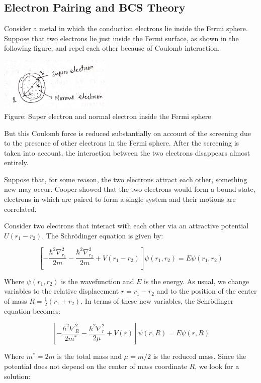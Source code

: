 \documentclass{article}
\begin{document}
\subsection{Electron Pairing and BCS Theory}

Consider a metal in which the conduction electrons lie inside the Fermi sphere. Suppose that two electrons lie just inside the Fermi surface, as shown in the following figure, and repel each other because of Coulomb interaction.

\begin{center}
    \includegraphics[width=0.4\textwidth]{figures/fermi_sphere.png} \\
    Figure: Super electron and normal electron inside the Fermi sphere
\end{center}

But this Coulomb force is reduced substantially on account of the screening due to the presence of other electrons in the Fermi sphere. After the screening is taken into account, the interaction between the two electrons disappears almost entirely.

Suppose that, for some reason, the two electrons attract each other, something new may occur. Cooper showed that the two electrons would form a bound state, electrons in which are paired to form a single system and their motions are correlated.

Consider two electrons that interact with each other via an attractive potential $U(r_1 - r_2)$. The Schrödinger equation is given by:

\[
\left[ -\frac{\hbar^2 \nabla_{r_1}^2}{2m} - \frac{\hbar^2 \nabla_{r_2}^2}{2m} + V(r_1 - r_2) \right] \psi(r_1, r_2) = E \psi(r_1, r_2) \tag{1}
\]

Where $\psi(r_1, r_2)$ is the wavefunction and $E$ is the energy. As usual, we change variables to the relative displacement $r = r_1 - r_2$ and to the position of the center of mass $R = \frac{1}{2}(r_1 + r_2)$. In terms of these new variables, the Schrödinger equation becomes:

\[
\left[ -\frac{\hbar^2 \nabla_{R}^2}{2m^*} - \frac{\hbar^2 \nabla_{r}^2}{2\mu} + V(r) \right] \psi(r, R) = E \psi(r, R) \tag{2}
\]

Where $m^* = 2m$ is the total mass and $\mu = m/2$ is the reduced mass. Since the potential does not depend on the center of mass coordinate $R$, we look for a solution:
\end{document}
